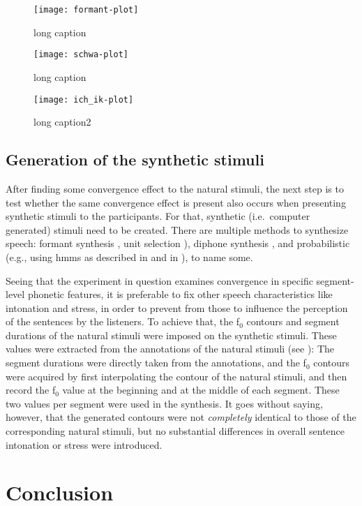 \begin{figure}[!t]
	\centering
	\texttt{[image: formant-plot]}
	\caption[short caption]{long caption}
	\label{fig:HCIConvFormants}
\end{figure}


\begin{figure}[!t]
	\centering
	\texttt{[image: schwa-plot]}
	\caption[short caption]{long caption}
	\label{fig:HCIConvSchwaPlot}
\end{figure}

\begin{figure}[!t]
	\centering
	\texttt{[image: ich\_ik-plot]}
	\caption[short caption]{long caption2}
	\label{fig:HCIConvIcIkPlot}
\end{figure}

\subsection{Generation of the synthetic stimuli}
\label{subsec:generation_stimuli_hci}

After finding some convergence effect to the natural stimuli, the next step is to test whether the same convergence effect is present also occurs when presenting synthetic stimuli to the participants.
For that, synthetic (i.e.\ computer generated) stimuli need to be created.
There are multiple methods to synthesize speech:
formant synthesis \citep[e.g.][]{Burkhardt2000verification}, unit selection \citep{Hunt1996unit,Black2003unit}), diphone synthesis \citep{Dutoit1996mbrola}, and probabilistic (e.g., using \acp{hmm} as described in \citet{Zen2005overview} and in \citet{Zen2009statistical}), to name some.

Seeing that the experiment in question examines convergence in specific segment-level phonetic features, it is preferable to fix other speech characteristics like intonation and stress, in order to prevent from those to influence the perception of the sentences by the listeners.
To achieve that, the f$_0$ contours and segment durations of the natural stimuli were imposed on the synthetic stimuli.
These values were extracted from the annotations of the natural stimuli (see \citet{Gessinger2016PundP}):
The segment durations were directly taken from the annotations, and the f$_0$ contours were acquired by first interpolating the contour of the natural stimuli, and then record the f$_0$ value at the beginning and at the middle of each segment.
These two values per segment were used in the synthesis.
It goes without saying, however, that the generated contours were not \emph{completely} identical to those of the corresponding natural stimuli, but no substantial differences in overall sentence intonation or stress were introduced.

\section{Conclusion}
\label{sec:conclusion_shadowing}